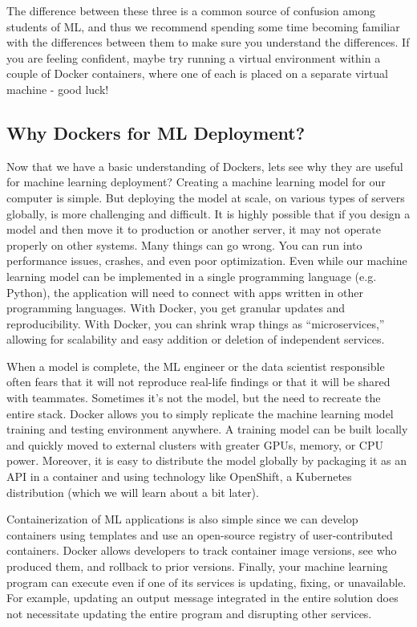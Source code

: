 {{{{{    The difference between these three is a common source of confusion among students of ML, and thus we recommend spending some time becoming familiar with the differences between them to make sure you understand the differences. If you are feeling confident, maybe try running a virtual environment within a couple of Docker containers, where one of each is placed on a separate virtual machine - good luck!
    
    \subsection{Why Dockers for ML Deployment?}
    
    Now that we have a basic understanding of Dockers, lets see why they are useful for machine learning deployment? Creating a machine learning model for our computer is simple. But deploying the model at scale, on various types of servers globally, is more challenging and difficult. It is highly possible that if you design a model and then move it to production or another server, it may not operate properly on other systems. Many things can go wrong. You can run into performance issues, crashes, and even poor optimization. Even while our machine learning model can be implemented in a single programming language (e.g. Python), the application will need to connect with apps written in other programming languages. With Docker, you get granular updates and reproducibility. With Docker, you can shrink wrap things as “microservices,” allowing for scalability and easy addition or deletion of independent services.
    
    When a model is complete, the ML engineer or the data scientist responsible often fears that it will not reproduce real-life findings or that it will be shared with teammates. Sometimes it's not the model, but the need to recreate the entire stack. Docker allows you to simply replicate the machine learning model training and testing environment anywhere.  A training model can be built locally and quickly moved to external clusters with greater GPUs, memory, or CPU power. Moreover, it is easy to distribute the model globally by packaging it as an API in a container and using technology like OpenShift, a Kubernetes distribution (which we will learn about a bit later).
    
    Containerization of ML applications is also simple since we can develop containers using templates and use an open-source registry of user-contributed containers. Docker allows developers to track container image versions, see who produced them, and rollback to prior versions. Finally, your machine learning program can execute even if one of its services is updating, fixing, or unavailable. For example, updating an output message integrated in the entire solution does not necessitate updating the entire program and disrupting other services.
    
}}}}}

